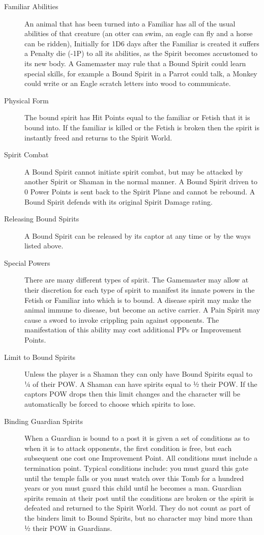 \begin{rpg-spell}
\begin{description}
\item[Familiar Abilities] An animal that has been turned into a Familiar has all of the usual abilities of that creature (an otter can swim, an eagle can fly and a horse can be ridden), Initially for 1D6 days after the Familiar is created it suffers a Penalty die (-1P) to all its abilities, as the Spirit becomes accustomed to its new body. A Gamemaster may rule that a Bound Spirit could learn special skills, for example a Bound Spirit in a Parrot could talk, a Monkey could write or an Eagle scratch letters into wood to communicate.  
\item[Physical Form] The bound spirit has Hit Points equal to the familiar or Fetish that it is bound into. If the familiar is killed or the Fetish is broken then the spirit is instantly freed and returns to the Spirit World.
\item[Spirit Combat] A Bound Spirit cannot initiate spirit combat, but may be attacked by another Spirit or Shaman in the normal manner. A Bound Spirit driven to 0 Power Points is sent back to the Spirit Plane and cannot be rebound. A Bound Spirit defends with its original Spirit Damage rating.
\item[Releasing Bound Spirits] A Bound Spirit can be released by its captor at any time or by the ways listed above.
\item[Special Powers] There are many different types of spirit. The Gamemaster may allow at their discretion for each type of spirit to manifest its innate powers in the Fetish or Familiar into which is to bound. A disease spirit may make the animal immune to disease, but become an active carrier. A Pain Spirit may cause a sword to invoke crippling pain against opponents. The manifestation of this ability may cost additional PPs or Improvement Points.
\item[Limit to Bound Spirits] Unless the player is a Shaman they can only have Bound Spirits equal to ¼ of their POW. A Shaman can have spirits equal to ½ their POW. If the captors POW drops then this limit changes and the character will be automatically be forced to choose which spirits to lose.
\item[Binding Guardian Spirits] When a Guardian is bound to a post it is given a set of conditions as to when it is to attack opponents, the first condition is free, but each subsequent one cost one Improvement Point. All conditions must include a termination point. Typical conditions include: you must guard this gate until the temple falls or you must watch over this Tomb for a hundred years or you must guard this child until he becomes a man. Guardian spirits remain at their post until the conditions are broken or the spirit is defeated and returned to the Spirit World. They do not count as part of the binders limit to Bound Spirits, but no character may bind more than ½ their POW in Guardians. 
\end{description}
\end{rpg-spell}


